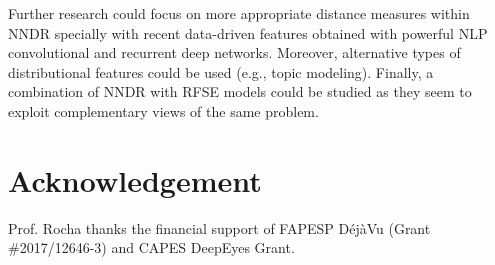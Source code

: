 \documentclass{llncs}
\begin{document}
Further research could focus on more appropriate distance measures within NNDR specially with recent data-driven features obtained with powerful NLP convolutional and recurrent deep networks. Moreover, alternative types of distributional features could be used (e.g., topic modeling). Finally, a combination of NNDR with RFSE models could be studied as they seem to exploit complementary views of the same problem.

\section*{Acknowledgement}
Prof. Rocha thanks the financial support of FAPESP DéjàVu (Grant \#2017/12646-3) and CAPES DeepEyes Grant.



\end{document}
